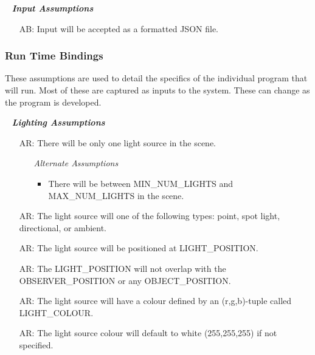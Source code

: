 \documentclass[12pt]{article}
\newcounter{assumpnum} %
\newcounter{assumpnumB} %
\newcounter{assumpnumR} %
\begin{document}
~\newline
\textbf{\emph{Input Assumptions}}
\begin{itemize}
	\item[AB\refstepcounter{assumpnumB}\theassumpnumB\label{as-input-format}:]
	Input will be accepted as a formatted JSON file.
\end{itemize}

\subsubsection{Run Time Bindings}
These assumptions are used to detail the specifics of the individual program 
that will run. Most of these are captured as inputs to the system. These can 
change as the program is developed.

~\newline
\textbf{\emph{Lighting Assumptions}}
\begin{itemize}
	\item[AR\refstepcounter{assumpnumR}\theassumpnumR\label{as-light-num}:]
	There will be only one light source in the scene.
	\begin{itemize}
		\item[] \textit{Alternate Assumptions}
		\begin{itemize}
			\item There will be between MIN\_NUM\_LIGHTS and MAX\_NUM\_LIGHTS 
			in the scene.
		\end{itemize}
	\end{itemize}		
	\item[AR\refstepcounter{assumpnumR}\theassumpnumR\label{as-light-type}:]
	The light source will one of the following types: point, spot light, 
	directional, or ambient.
	\item[AR\refstepcounter{assumpnumR}\theassumpnumR\label{as-light-init-pos}:]
	The light source will be positioned at LIGHT\_POSITION.	
	\item[AR\refstepcounter{assumpnumR}\theassumpnumR\label{as-light-overlap}:]
	The LIGHT\_POSITION will not overlap with the OBSERVER\_POSITION or any 
	OBJECT\_POSITION.
	\item[AR\refstepcounter{assumpnumR}\theassumpnumR\label{as-light-colour}:]
	The light source will have a colour defined by an (r,g,b)-tuple called 
	LIGHT\_COLOUR.
	\item[AR\refstepcounter{assumpnumR}\theassumpnumR\label{as-light-default-colour}:]
	The light source colour will default to white (255,255,255) if not 
	specified.
	
\end{itemize}
\end{document}

